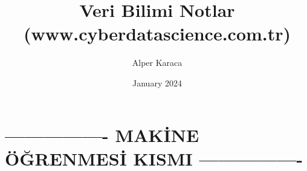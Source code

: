 \documentclass{article}
\title{Veri Bilimi Notlar (www.cyberdatascience.com.tr)}
\author{Alper Karaca}
\date{January 2024}
\begin{document}
\maketitle

\newpage
\tableofcontents
\newpage




\section{---------------- MAKİNE ÖĞRENMESİ KISMI ----------------}
\newpage

























































\end{document}
